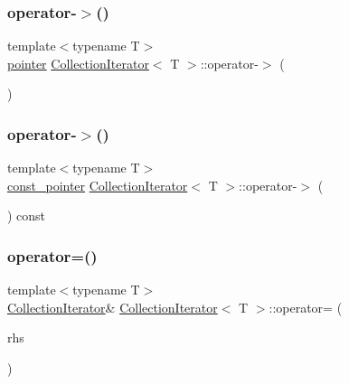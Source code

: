 \subsubsection{\texorpdfstring{operator-\/$>$()}{operator->()}\hspace{0.1cm}{\footnotesize\ttfamily [1/2]}}
{\footnotesize\ttfamily template$<$typename T$>$ \\
\hyperlink{class_collection_iterator_aff846a9c86022d66a7eb10e3623a0ba0}{pointer} \hyperlink{class_collection_iterator}{Collection\+Iterator}$<$ T $>$\+::operator-\/$>$ (\begin{DoxyParamCaption}{ }\end{DoxyParamCaption})\hspace{0.3cm}{\ttfamily [inline]}}

\mbox{\label{class_collection_iterator_a1892f0cf674eaad4c9d02bfcda128eb3}} 
\subsubsection{\texorpdfstring{operator-\/$>$()}{operator->()}\hspace{0.1cm}{\footnotesize\ttfamily [2/2]}}
{\footnotesize\ttfamily template$<$typename T$>$ \\
\hyperlink{class_collection_iterator_a9bff5744ce1cfc8f704fa52557699594}{const\+\_\+pointer} \hyperlink{class_collection_iterator}{Collection\+Iterator}$<$ T $>$\+::operator-\/$>$ (\begin{DoxyParamCaption}{ }\end{DoxyParamCaption}) const\hspace{0.3cm}{\ttfamily [inline]}}

\mbox{\label{class_collection_iterator_a2a03298e6ea06b1e6344cf4be9e1439e}} 
\subsubsection{\texorpdfstring{operator=()}{operator=()}\hspace{0.1cm}{\footnotesize\ttfamily [1/2]}}
{\footnotesize\ttfamily template$<$typename T$>$ \\
\hyperlink{class_collection_iterator}{Collection\+Iterator}\& \hyperlink{class_collection_iterator}{Collection\+Iterator}$<$ T $>$\+::operator= (\begin{DoxyParamCaption}\item[{const \hyperlink{class_collection_iterator}{Collection\+Iterator}$<$ T $>$ \&}]{rhs }\end{DoxyParamCaption})\hspace{0.3cm}{\ttfamily [inline]}}

